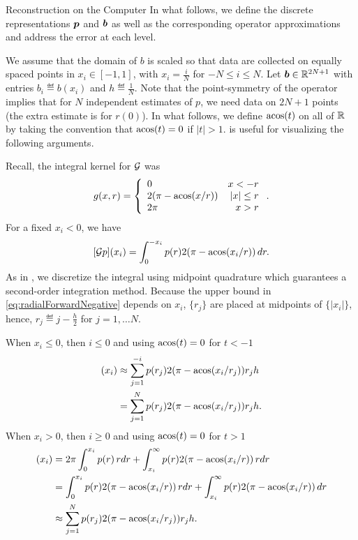 \begin{chapter}{Reconstruction on the Computer}
In what follows, we define the discrete representations $\mbox{\boldmath$p$}$ and $\mbox{\boldmath$b$}$ as well as the corresponding operator approximations and address the error at each level.

We assume that the domain of $b$ is scaled so that data are collected on equally spaced points in $x_i \in [-1,1]$, with $x_i = \frac iN$ for $-N\le i\le N$.
Let $\mbox{\boldmath$b$} \in \mathbb R^{2N + 1}$ with entries $b_i \eqdef b(x_i)$ and $h\eqdef \frac 1N$. 
Note that the point-symmetry of the operator implies that for $N$ independent estimates of $p$, we need data on $2N + 1$ points (the extra estimate is for $r(0)$).
In what follows, we define $\operatorname*{acos}(t)$ on all of $\mathbb R$ by taking the convention that $\operatorname*{acos}(t) = 0$ if $|t| > 1$.
 is useful for visualizing the following arguments.

Recall, the integral kernel for $\mathcal G$ was
\begin{equation} 
  g(x,r) = \left\{\begin{array}{lr}
    0 & x < - r\\
    2(\pi - \operatorname*{acos}(x/r)) & |x| \le r\\
    2\pi &  x> r
  \end{array}\right..  
\end{equation}
For a fixed  $x_i<0$, we have
\begin{equation} \label{eq:radialForwardNegative}
  [\mathcal G p](x_i) = \int_0^{-x_i} p(r)2(\pi - \operatorname*{acos}(x_i/r))\,dr.
\end{equation}
As in \citep{bardsley2012mcmc}, we discretize the integral using midpoint quadrature which guarantees a second-order integration method.
Because the upper bound in \eqref{eq:radialForwardNegative} depends on $x_i$, $\{r_j\}$ are placed at midpoints of $\{|x_i|\}$, hence, $r_j \eqdef j-\frac h2$ for $j=1,\dots N$. 

When $x_i \le 0$, then $i \le 0$ and using $\operatorname*{acos}(t) = 0$ for $t<-1$
\begin{align}
  [\G p](x_i) 
    &\approx \sum_{j=1}^{-i} p(r_j)2(\pi - \acos(x_i/r_j)) r_jh \nonumber\\
    &= \sum_{j=1}^{N} p(r_j)2(\pi - \acos(x_i/r_j)) r_jh. \label{eq:radialForwardApproxPositive}
\end{align}
When $x_i > 0$, then $i \ge 0$ and using $\operatorname*{acos}(t) = 0$ for $t>1$ 
\begin{align}
  [\G p](x_i) 
    &= 2\pi \int_0^{x_i} p(r)\,rdr + \int_{x_i}^\infty p(r)2(\pi - \acos(x_i/r))\,rdr\nonumber \\
    &= \int_0^{x_i} p(r) 2(\pi - \acos(x_i/r))\,rdr + \int_{x_i}^\infty p(r)2(\pi - \acos(x_i/r))\,dr\nonumber \\
    &\approx \sum_{j=1}^{N} p(r_j)2(\pi - \acos(x_i/r_j)) r_jh. \label{eq:radialForwardApproxNegative}
\end{align}


\end{chapter}

